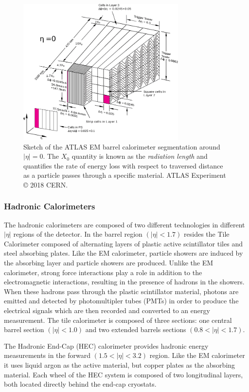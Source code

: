 \begin{figure}
	\centering
	\includegraphics[width=0.75\textwidth]{em_calo_segment}
	\caption{Sketch of the ATLAS EM barrel calorimeter segmentation around $|\eta| = 0$. 
	The $X_0$ quantity is known as the \textit{radiation length} and quantifies the rate of energy loss with respect to traversed distance as a particle passes through a specific material.
	ATLAS Experiment © 2018 CERN.}
	\label{fig:em_calo_segment}
\end{figure}

\subsubsection{Hadronic Calorimeters}
The hadronic calorimeters are composed of two different technologies in different $|\eta|$ regions of the detector.
In the barrel region $(|\eta| < 1.7)$ resides the Tile Calorimeter composed of alternating layers of plastic active scintillator tiles and steel absorbing plates.
Like the EM calorimeter, particle showers are induced by the absorbing layer and particle showers are produced.
Unlike the EM calorimeter, strong force interactions play a role in addition to the electromagnetic interactions, resulting in the presence of hadrons in the showers.
When these hadrons pass through the plastic scintillator material, photons are emitted and detected by photomultipler tubes (PMTs) in order to produce the electrical signals which are then recorded and converted to an energy measurement.
The tile calorimeter is composed of three sections: one central barrel section $(|\eta| < 1.0)$ and two extended barrels sections $(0.8 < |\eta| < 1.7)$.

The Hadronic End-Cap (HEC) calorimeter provides hadronic energy measurements in the forward $(1.5 < |\eta| < 3.2)$ region.
Like the EM calorimeter it uses liquid argon as the active material, but copper plates as the absorbing material.
Each wheel of the HEC system is composed of two longitudinal layers, both located directly behind the end-cap cryostats.

